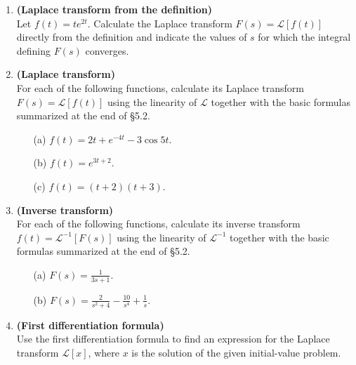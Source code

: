 \documentclass[12pt]{article}
\newcommand{\cL}{{\mathcal L}}
\begin{document}
\begin{enumerate}[1.]
\setlength{\itemsep}{5mm}

\item \textbf{(Laplace transform from the definition)} \\
Let $f(t) = te^{2t}$.  Calculate the Laplace transform
  $F(s) = \cL[f(t)]$ directly
  from the definition and indicate the values of $s$ for which the
  integral defining $F(s)$ converges.

\item \textbf{(Laplace transform)} \\
For each of the following functions, calculate its Laplace
  transform $F(s) = \cL[f(t)]$ using the linearity of $\cL$ together
  with the basic formulas summarized at the end of \S 5.2.
  
  \bigskip
  \begin{enumerate}
    \setlength{\itemsep}{2mm}
  \item[(a)] $f(t) = 2t + e^{-4t} - 3\cos 5t$.
  \item[(b)] $f(t) = e^{3t+2}$.
    \item[(c)] $f(t) = (t+2)(t+3)$.
      \end{enumerate}

  \item \textbf{(Inverse transform)} \\
  For each of the following functions, calculate its inverse
  transform $f(t) = \cL^{-1}[F(s)]$ using the linearity of $\cL^{-1}$ together
  with the basic formulas summarized at the end of \S 5.2.
  \begin{enumerate}
    \setlength{\itemsep}{2mm}
  \item[(a)] $F(s) =\displaystyle \frac{1}{3s+1}$.
 
  \item[(b)] $F(s) = \displaystyle \frac{2}{s^2+4} -\frac{10}{s^4}
    +\frac{1}{s}$.
    
    \end{enumerate}

    \item \textbf{(First differentiation formula)} \\
    Use the first differentiation formula to find an expression
      for the Laplace transform $\cL[x]$, where $x$ is the solution of
      the given initial-value problem.
    

\end{enumerate}
\end{document}
